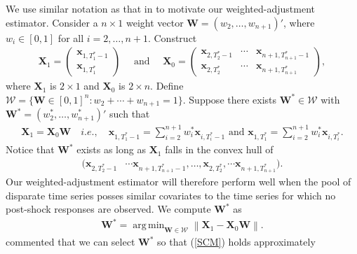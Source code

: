 \documentclass[11pt]{article}
\def\mbf#1{\mathbf{#1}} %
\def\mc#1{\mathcal{#1}} %
\DeclareMathOperator*{\argmin}{arg\,min} %
\newcommand{\norm}[1]{\left\lVert#1\right\rVert} %
\theoremstyle{definition}
\begin{document}
We use similar notation as that in \cite{abadie2010synthetic} to motivate 
our weighted-adjustment estimator. Consider a $n\times 1$ weight vector 
$\mbf{W}=(w_2, \ldots, w_{n+1})'$, where $w_i\in [0,1]$ for all 
$i = 2, \ldots, n+1$. Construct
\begin{align*}
  \mbf{X}_1 = \begin{pmatrix}
    \mbf{x}_{1, T_1^*-1} \\ \mbf{x}_{1, T_1^*}
  \end{pmatrix} \quad 
  \text{ and } \quad \mbf{X}_0 = \begin{pmatrix}
    \mbf{x}_{2, T_2^*-1} & \cdots & \mbf{x}_{n+1, T_{n+1}^*-1} \\
    \mbf{x}_{2, T_2^*} & \cdots & \mbf{x}_{n+1, T_{n+1}^*} 
  \end{pmatrix},
\end{align*}
where $\mbf{X}_1$ is $2 \times 1$ and $\mbf{X}_0$ is $2\times n$. 
Define $\mc{W}=\{\mbf{W}\in [0,1]^n \colon w_2+ \cdots + w_{n+1}=1 \}$. 
Suppose there exists $\mbf{W}^*\in \mc{W}$ with 
$\mbf{W}^*=(w_2^*, \ldots, w_{n+1}^*)'$ such that
\begin{align}
 \mbf{X}_1=\mbf{X}_0 \mbf{W}  \quad i.e., \quad \mbf{x}_{1, T_1^*-1} = \sum_{i=2}^{n+1} w_i^*\mbf{x}_{i, T_i^*-1} \text{ and } \mbf{x}_{1, T_1^*} = \sum_{i=2}^{n+1} w_i^*\mbf{x}_{i, T_i^*}.\label{SCM}
\end{align}
Notice that $\mbf{W}^*$ exists as long as $\mbf{X}_1$ falls in the convex hull of 
\begin{align}
    (\mbf{x}_{2, T_2^*-1} & \cdots \mbf{x}_{n+1, T_{n+1}^*-1}, \ldots, 
    \mbf{x}_{2, T_2^*},  \cdots  \mbf{x}_{n+1, T_{n+1}^*}). \label{convexhull}
\end{align}
Our weighted-adjustment estimator will therefore perform well when the pool of 
disparate time series posses similar covariates to the time series for which 
no post-shock responses are observed. We compute $\mbf{W}^*$ as
\begin{align}
  \mbf{W}^* = \argmin_{\mbf{W}\in \mc{W}} \norm{\mbf{X}_1-\mbf{X}_0\mbf{W}}. 
  \label{W}
\end{align}
\cite{abadie2010synthetic} commented that we can select $\mbf{W}^*$ 
so that (\ref{SCM}) holds approximately %
\end{document}
